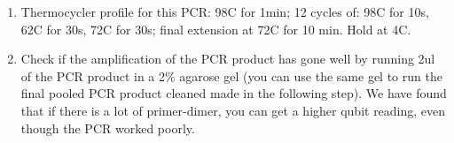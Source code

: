 \documentclass[11pt, oneside]{article}
\begin{document}
\begin{enumerate}
\begin{table}[h]
\begin{tabular}{ | c | >{\centering\arraybackslash} m{10em} |}
						\hline	
					\end{tabular}
				\end{table}

				\vspace{3mm}

	\item Thermocycler profile for this PCR: 98C for 1min; 12 cycles of: 98C for 10s, 62C for 30s,
				72C for 30s; final extension at 72C for 10 min. Hold at 4C.
				
	\item Check if the amplification of the PCR product has gone well by running 2ul of the PCR product in a 2\% agarose gel (you can use the same gel to run the final pooled PCR product cleaned made in the following step).  We have found that if there is a lot of primer-dimer, you can get a higher qubit reading, even though the PCR worked poorly.
	\end{enumerate}
	
\end{document}
